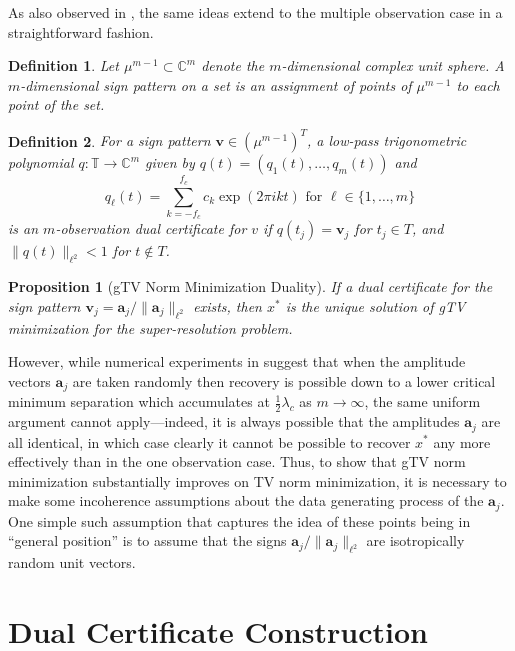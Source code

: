 \documentclass[11pt]{article}
\newcommand{\TT}{\mathbb{T}}
\newcommand{\CC}{\mathbb{C}}
\newcommand{\ba}{\bm a}
\newcommand{\bv}{\bm v}
\newtheorem{definition}{Definition}
\newtheorem{proposition}{Proposition}
\begin{document}
As also observed in \cite{fernandez2016super}, the same ideas extend to the multiple observation case in a straightforward fashion.
\begin{definition}
    Let $\mu^{m - 1} \subset \CC^m$ denote the $m$-dimensional complex unit sphere.
    A \emph{$m$-dimensional sign pattern} on a set is an assignment of points of $\mu^{m - 1}$ to each point of the set.
\end{definition}
\begin{definition}
    For a sign pattern $\bv \in (\mu^{m - 1})^T$, a low-pass trigonometric polynomial $q: \TT \to \CC^m$ given by $q(t) = (q_1(t), \dots, q_m(t))$ and
    \begin{equation}
        q_\ell(t) = \sum_{k = -f_c}^{f_c} c_k \exp(2\pi i k t) \text{ for } \ell \in \{1, \dots, m\}
    \end{equation}
    is an \emph{$m$-observation dual certificate} for $v$ if $q(t_j) = \bv_j$ for $t_j \in T$, and $\|q(t)\|_{\ell^2} < 1$ for $t \notin T$.
\end{definition}
\begin{proposition}[\textsf{gTV} Norm Minimization Duality]
    If a dual certificate for the sign pattern $\bv_j = \ba_{j} / \|\ba_{j}\|_{\ell^2}$ exists, then $x^*$ is the unique solution of \textsf{gTV} minimization for the super-resolution problem.
\end{proposition}
However, while numerical experiments in \cite{fernandez2016super} suggest that when the amplitude vectors $\ba_j$ are taken randomly then recovery is possible down to a lower critical minimum separation which accumulates at $\frac{1}{2}\lambda_c$ as $m \to \infty$, the same uniform argument cannot apply---indeed, it is always possible that the amplitudes $\ba_j$ are all identical, in which case clearly it cannot be possible to recover $x^*$ any more effectively than in the one observation case.
Thus, to show that \textsf{gTV} norm minimization substantially improves on \textsf{TV} norm minimization, it is necessary to make some incoherence assumptions about the data generating process of the $\ba_j$.
One simple such assumption that captures the idea of these points being in ``general position'' is to assume that the signs $\ba_j / \|\ba_j\|_{\ell^2}$ are isotropically random unit vectors.

\section{Dual Certificate Construction}
\end{document}
